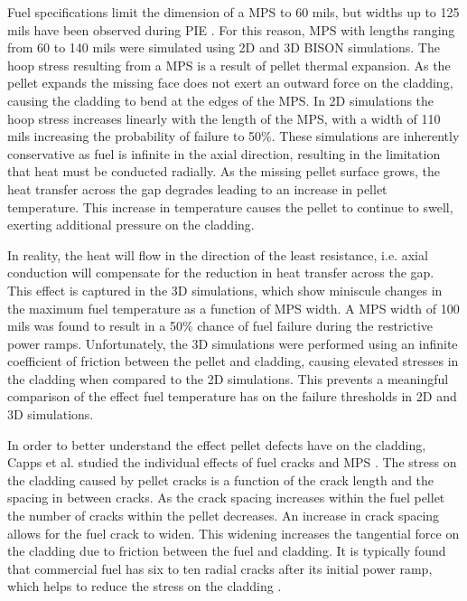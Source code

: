 \documentclass[edeposit,fullpage,11pt]{uiucthesis2009}
\begin{document}
Fuel specifications limit the dimension of a \gls{MPS} to 60 mils, but widths up to 125 mils have been observed during \gls{PIE} \cite{aleshin_effect_2010}.
For this reason, \gls{MPS} with lengths ranging from 60 to 140 mils were simulated using 2D and 3D BISON simulations. 
The hoop stress resulting from a \gls{MPS} is a result of pellet thermal expansion. 
As the pellet expands the missing face does not exert an outward force on the cladding, causing the cladding to bend at the edges of the \gls{MPS}.
In 2D simulations the hoop stress increases linearly with the length of the \gls{MPS}, with a width of 110 mils increasing the probability of failure to 50\%.
These simulations are inherently conservative as fuel is infinite in the axial direction, resulting in the limitation that heat must be conducted radially.
As the missing pellet surface grows, the heat transfer across the gap degrades leading to an increase in pellet temperature.
This increase in temperature causes the pellet to continue to swell, exerting additional pressure on the cladding.

In reality, the heat will flow in the direction of the least resistance, i.e. axial conduction will compensate for the reduction in heat transfer across the gap.
This effect is captured in the 3D simulations, which show miniscule changes in the maximum fuel temperature as a function of \gls{MPS} width.
A \gls{MPS} width of 100 mils was found to result in a 50\% chance of fuel failure during the restrictive power ramps.
Unfortunately, the 3D simulations were performed using an infinite coefficient of friction between the pellet and cladding, causing elevated stresses in the cladding when compared to the 2D simulations.
This prevents a meaningful comparison of the effect fuel temperature has on the failure thresholds in 2D and 3D simulations.


In order to better understand the effect pellet defects have on the cladding, Capps et al. studied the individual effects of fuel cracks and \gls{MPS} \cite{capps_evaluation_2016}.
The stress on the cladding caused by pellet cracks is a function of the crack length and the spacing in between cracks.
As the crack spacing increases within the fuel pellet the number of cracks within the pellet decreases.
An increase in crack spacing allows for the fuel crack to widen.
This widening increases the tangential force on the cladding due to friction between the fuel and cladding.
It is typically found that commercial fuel has six to ten radial cracks after its initial power ramp, which helps to reduce the stress on the cladding \cite{oguma_cracking_1983}. 
\end{document}
